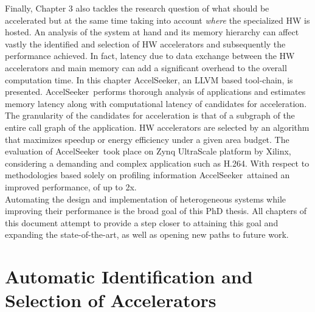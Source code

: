 \documentclass[]{usiinfthesis}
\newcommand{\aseeker}{{AccelSeeker}}
\newcommand{\htsf}{{H.264}}
\newcommand{\SoTA}{{state-of-the-art}}
\begin{document}
Finally, Chapter 3 also tackles the research question of what should be accelerated but at the same time
taking into account {\em where} the specialized HW is hosted.
An analysis of the system at hand and its memory hierarchy can affect vastly the identified and selection
of HW accelerators and subsequently the performance achieved. In fact, latency due to data exchange
between the HW accelerators and main memory can add a significant overhead to the overall 
computation time. In this chapter \aseeker, an LLVM based tool-chain, is presented. \aseeker\ 
performs thorough analysis of applications
and estimates memory latency along with computational latency of candidates for acceleration. The 
granularity of the candidates for acceleration is that of a subgraph of the entire call graph of 
the application. 
HW accelerators are selected by an algorithm that maximizes speedup or energy efficiency 
under a given area budget. The evaluation 
of \aseeker\ took place on Zynq UltraScale platform by Xilinx, considering a demanding and complex 
application such as \htsf. With respect to methodologies based solely on profiling information \aseeker\ 
attained an improved performance, of up to 2x.\\
Automating the design and implementation of heterogeneous systems while
improving their performance is the broad goal of this PhD thesis. All chapters of this document 
attempt to provide a step closer to attaining this goal and expanding the \SoTA, as well as opening 
new paths to future work.


%
%
%
%
%  
%
%
%
%
%

\chapter%
{Automatic Identification and Selection of Accelerators}
\end{document}
